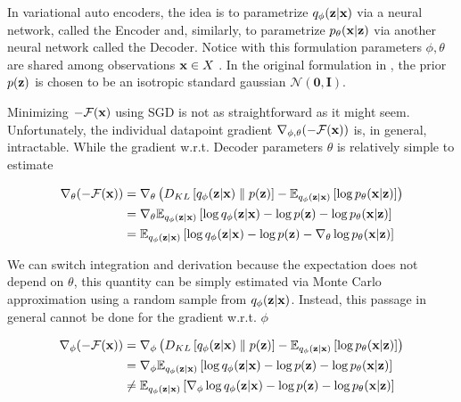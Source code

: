 \documentclass[12pt]{article}
\begin{document}
In variational auto encoders, the idea is to parametrize \(q_{\phi}( \textbf{z}| \textbf{x})\) via a neural network, called the Encoder and, similarly, to parametrize \(p_{\theta}( \textbf{x}| \textbf{z})\) via another neural network called the Decoder. Notice with this formulation parameters \(\phi, \theta\) are shared among observations \(\textbf{x} \in  X\) \cite{VAEIntro}. In the original formulation in \cite{kingma2022autoencoding}, the prior \(p( \textbf{z})\) is chosen to be an isotropic standard gaussian \(\mathcal{N}(\textbf{0}, \textbf{I})\). 


Minimizing \(-\mathcal{F}( \textbf{x})\) using SGD is not as straightforward as it might seem. Unfortunately, the individual datapoint gradient \(\nabla_{\phi, \theta}(-\mathcal{F}(\textbf{x}))\) is, in general, intractable\cite{VAEIntro}. While the gradient w.r.t. Decoder parameters \(\theta\) is relatively simple to estimate

\begin{align}
    \nabla_{\theta}(-\mathcal{F}(\textbf{x})) &= \nabla_{\theta} \left( D_{KL}\left[ q_{\phi}(\textbf{z}|\textbf{x}) \parallel p(\textbf{z}) \right] - \mathbb{E}_{q_{\phi}(\textbf{z}|\textbf{x})} \left[ \log p_{\theta}(\textbf{x}|\textbf{z}) \right] \right) \nonumber \\
    &= \nabla_{\theta} \mathbb{E}_{q_{\phi}(\textbf{z}|\textbf{x})} \left[\log q_\phi (\textbf{z}|\textbf{x}) -\log p(\textbf{z}) - \log p_\theta (\textbf{x} | \textbf{z})\right] \nonumber \\
    &= \mathbb{E}_{q_{\phi}(\textbf{z}|\textbf{x})} \left[\log q_\phi (\textbf{z}|\textbf{x}) -\log p(\textbf{z}) - \nabla_{\theta}\log p_\theta (\textbf{x} | \textbf{z}) \right] 
\end{align}

We can switch integration and derivation because the expectation does not depend on \(\theta\), this quantity can be simply estimated via Monte Carlo approximation using a random sample from \(q_\phi (\textbf{z}|\textbf{x})\). Instead, this passage in general cannot be done for the gradient w.r.t. \(\phi\)

\begin{align}
    \label{eqn:grad_phi_ELBO}
    \nabla_{\phi}(-\mathcal{F}(\textbf{x})) &= \nabla_{\phi} \left( D_{KL}\left[ q_{\phi}(\textbf{z}|\textbf{x}) \parallel p(\textbf{z}) \right] - \mathbb{E}_{q_{\phi}(\textbf{z}|\textbf{x})} \left[ \log p_{\theta}(\textbf{x}|\textbf{z}) \right] \right) \nonumber \\
    &= \nabla_{\phi} \mathbb{E}_{q_{\phi}(\textbf{z}|\textbf{x})} \left[\log q_\phi (\textbf{z}|\textbf{x}) -\log p(\textbf{z}) - \log p_\theta (\textbf{x} | \textbf{z})\right] \nonumber \\
    &\neq \mathbb{E}_{q_{\phi}(\textbf{z}|\textbf{x})} \left[\nabla_{\phi} \log q_\phi (\textbf{z}|\textbf{x}) -\log p(\textbf{z}) - \log p_\theta (\textbf{x} | \textbf{z}) \right] 
\end{align}
\end{document}
